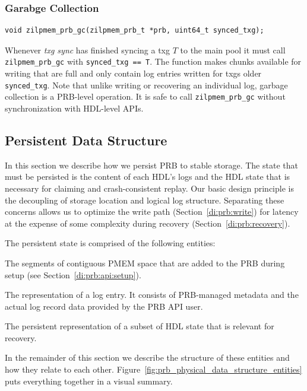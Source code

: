 \documentclass[12pt,a4paper,twoside]{book}
\begin{document}
\subsubsection{Garabge Collection}

\begin{lstlisting}
void zilpmem_prb_gc(zilpmem_prb_t *prb, uint64_t synced_txg);
\end{lstlisting}

Whenever \textit{txg sync} has finished syncing a txg $T$ to the main pool it must call \lstinline{zilpmem_prb_gc} with \lstinline{synced_txg == T}.
The function makes chunks available for writing that are full and only contain log entries written for txgs older \lstinline{synced_txg}.
Note that unlike writing or recovering an individual log, garbage collection is a PRB-level operation.
It is safe to call \lstinline{zilpmem_prb_gc} without synchronization with HDL-level APIs.

\subsection{Persistent Data Structure}\label{di:prb:persistent}
In this section we describe how we persist PRB to stable storage.
The state that must be persisted is the content of each HDL's logs and the HDL state that is necessary for claiming and crash-consistent replay.
Our basic design principle is the decoupling of storage location and logical log structure.
Separating these concerns allows us to optimize the write path (Section~\ref{di:prb:write}) for latency at the expense of some complexity during recovery (Section~\ref{di:prb:recovery}).

The persistent state is comprised of the following entities:
\begin{description}[noitemsep,leftmargin=1.5cm,labelindent=1cm]
    \item[PMEM chunks] The segments of contiguous PMEM space that are added to the PRB during setup (see Section~\ref{di:prb:api:setup}).
    \item[Entry] The representation of a log entry. It consists of PRB-managed metadata and the actual log record data provided by the PRB API user.
    \item[ZIL Header] The persistent representation of a subset of HDL state that is relevant for recovery.
\end{description}
In the remainder of this section we describe the structure of these entities and how they relate to each other.
Figure~\ref{fig:prb_physical_data_structure_entities} puts everything together in a visual summary.
\end{document}
